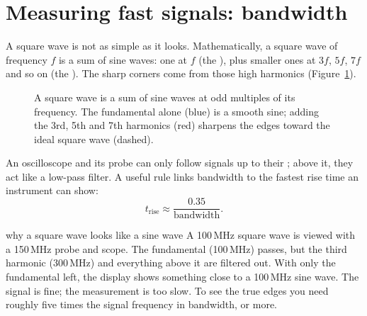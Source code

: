 \section{Measuring fast signals: bandwidth}
\label{sec:probe}

A square wave is not as simple as it looks. Mathematically, a square wave of frequency $f$ is a sum of sine waves: one at $f$ (the ), plus smaller ones at $3f$, $5f$, $7f$ and so on (the ). The sharp corners come from those high harmonics (Figure~\ref{fig:harmonics}).

\begin{figure}[h]
\centering
{}
\caption{A square wave is a sum of sine waves at odd multiples of its frequency. The fundamental alone (blue) is a smooth sine; adding the 3rd, 5th and 7th harmonics (red) sharpens the edges toward the ideal square wave (dashed).}
\label{fig:harmonics}
\end{figure}

An oscilloscope and its probe can only follow signals up to their ; above it, they act like a low-pass filter. A useful rule links bandwidth to the fastest rise time an instrument can show:
\[
  t_{\text{rise}} \approx \frac{0.35}{\text{bandwidth}}.
\]

\begin{worked}{why a square wave looks like a sine wave}
A 100\,MHz square wave is viewed with a 150\,MHz probe and scope. The fundamental (100\,MHz) passes, but the third harmonic (300\,MHz) and everything above it are filtered out. With only the fundamental left, the display shows something close to a 100\,MHz sine wave. The signal is fine; the measurement is too slow. To see the true edges you need roughly five times the signal frequency in bandwidth, or more.
\end{worked}

